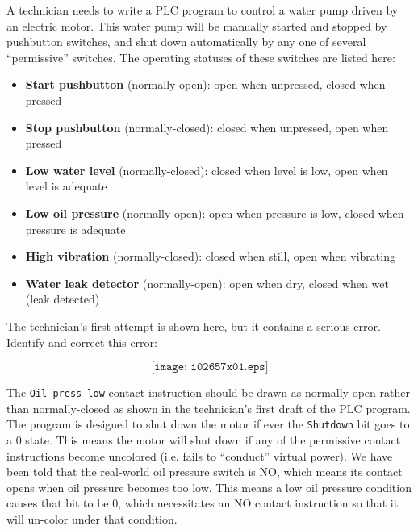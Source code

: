 

A technician needs to write a PLC program to control a water pump driven by an electric motor.  This water pump will be manually started and stopped by pushbutton switches, and shut down automatically by any one of several ``permissive'' switches.  The operating statuses of these switches are listed here:

\begin{itemize}
\item{} {\bf Start pushbutton} (normally-open): open when unpressed, closed when pressed
\item{} {\bf Stop pushbutton} (normally-closed): closed when unpressed, open when pressed
\item{} {\bf Low water level} (normally-closed): closed when level is low, open when level is adequate
\item{} {\bf Low oil pressure} (normally-open): open when pressure is low, closed when pressure is adequate
\item{} {\bf High vibration} (normally-closed): closed when still, open when vibrating
\item{} {\bf Water leak detector} (normally-open): open when dry, closed when wet (leak detected)
\end{itemize}

The technician's first attempt is shown here, but it contains a serious error.  Identify and correct this error:

$$\texttt{[image: i02657x01.eps]}$$







The {\tt Oil\_press\_low} contact instruction should be drawn as normally-open rather than normally-closed as shown in the technician's first draft of the PLC program.  The program is designed to shut down the motor if ever the {\tt Shutdown} bit goes to a 0 state.  This means the motor will shut down if any of the permissive contact instructions become uncolored (i.e. fails to ``conduct'' virtual power).  We have been told that the real-world oil pressure switch is NO, which means its contact opens when oil pressure becomes too low.  This means a low oil pressure condition causes that bit to be 0, which necessitates an NO contact instruction so that it will un-color under that condition.











